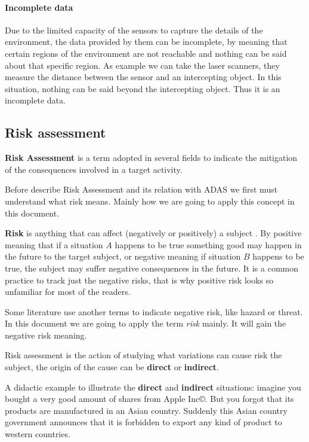 \paragraph{Incomplete data} Due to the limited capacity of the sensors to capture the details of the environment, the data provided by them can be incomplete, by meaning that certain regions of the environment are not reachable and nothing can be said about that specific region. As example we can take the laser scanners, they measure the distance between the sensor and an intercepting object. In this situation, nothing can be said beyond the intercepting object. Thus it is an incomplete data.

\subsection{Risk assessment}
\label{sec:riskassessment}

\textbf{Risk Assessment} is a term adopted in several fields to indicate the mitigation of the consequences involved in a target activity. 

Before describe Risk Assessment and its relation with ADAS we first must understand what risk means. Mainly how we are going to apply this concept in this document. 

\textbf{Risk} is anything that can affect (negatively or positively) a subject \cite{mulcahy2011pmp}. By positive meaning that if a situation $A$ happens to be true something good may happen in the future to the target subject, or negative meaning if situation $B$ happens to be true, the subject may suffer negative consequences in the future. It is a common practice to track just the negative risks, that is why positive risk looks so unfamiliar for most of the readers. 

Some literature use another terms to indicate negative risk, like hazard or threat. In this document we are going to apply the term \textit{risk} mainly. It will gain the negative risk meaning.

Risk assessment is the action of studying what variations can cause risk the subject, the origin of the cause can be \textbf{direct} or \textbf{indirect}.

A didactic example to illustrate the \textbf{direct} and \textbf{indirect} situations: imagine you bought a very good amount of shares from Apple Inc\copyright. But you forgot that its products are manufactured in an Asian country. Suddenly this Asian country government announces that it is forbidden to export any kind of product to western countries. 

